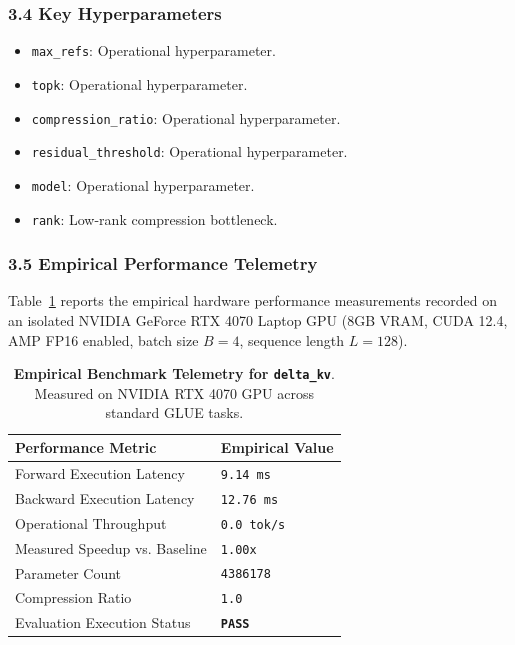 \subsubsection*{3.4 Key Hyperparameters}
\begin{itemize}
    \item \texttt{max\_refs}: Operational hyperparameter.
    \item \texttt{topk}: Operational hyperparameter.
    \item \texttt{compression\_ratio}: Operational hyperparameter.
    \item \texttt{residual\_threshold}: Operational hyperparameter.
    \item \texttt{model}: Operational hyperparameter.
    \item \texttt{rank}: Low-rank compression bottleneck.
\end{itemize}

\subsubsection*{3.5 Empirical Performance Telemetry}
Table~\ref{tab:telemetry_delta\_kv} reports the empirical hardware performance measurements recorded on an isolated NVIDIA GeForce RTX 4070 Laptop GPU (8GB VRAM, CUDA 12.4, AMP FP16 enabled, batch size $B=4$, sequence length $L=128$).

\begin{table}[h]
\centering
\small
\caption{\textbf{Empirical Benchmark Telemetry for \texttt{delta\_kv}}. Measured on NVIDIA RTX 4070 GPU across standard GLUE tasks.}
\label{tab:telemetry_delta\_kv}
\begin{tabularx}{\columnwidth}{lX}
\toprule
\textbf{Performance Metric} & \textbf{Empirical Value} \\
\midrule
Forward Execution Latency & \texttt{9.14 ms} \\
Backward Execution Latency & \texttt{12.76 ms} \\
Operational Throughput & \texttt{0.0 tok/s} \\
Measured Speedup vs. Baseline & \texttt{1.00x} \\
Parameter Count & \texttt{4386178} \\
Compression Ratio & \texttt{1.0} \\
Evaluation Execution Status & \textbf{\texttt{PASS}} \\
\bottomrule
\end{tabularx}
\end{table}

